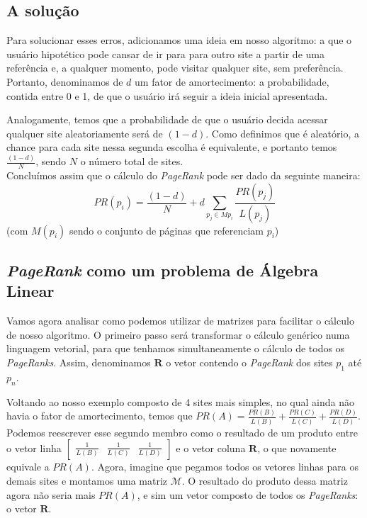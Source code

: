 \documentclass[11pt]{article}
\begin{document}
    \hypertarget{a-soluuxe7uxe3o}{%
\subsection{A solução}\label{a-soluuxe7uxe3o}}

Para solucionar esses erros, adicionamos uma ideia em nosso algoritmo: a
que o usuário hipotético pode cansar de ir para para outro site a partir
de uma referência e, a qualquer momento, pode visitar qualquer site, sem
preferência. Portanto, denominamos de \(d\) um fator de amortecimento: a
probabilidade, contida entre 0 e 1, de que o usuário irá seguir a ideia
inicial apresentada.

    Analogamente, temos que a probabilidade de que o usuário decida acessar
qualquer site aleatoriamente será de \((1 - d)\). Como definimos que é
aleatório, a chance para cada site nessa segunda escolha é equivalente,
e portanto temos \(\frac{(1 - d)}{N}\), sendo \(N\) o número total de
sites.\\
Concluímos assim que o cálculo do \emph{PageRank} pode ser dado da
seguinte maneira:
\[PR(p_i) = \displaystyle \frac{(1 - d)}{N} + d{\sum _{p_j\in M{p_i}}{\frac {PR(p_j)}{L(p_j)}}}\]
(com \(M(p_i)\) sendo o conjunto de páginas que referenciam \(p_i\))

    \hypertarget{pagerank-como-um-problema-de-uxe1lgebra-linear}{%
\subsection{\texorpdfstring{\emph{PageRank} como um problema de
Álgebra
Linear}{PageRank como um problema de Álgebra Linear}}\label{pagerank-como-um-problema-de-uxe1lgebra-linear}}

Vamos agora analisar como podemos utilizar de matrizes para facilitar o
cálculo de nosso algoritmo. O primeiro passo será transformar o cálculo
genérico numa linguagem vetorial, para que tenhamos simultaneamente o
cálculo de todos os \emph{PageRanks}. Assim, denominamos \(\mathbf {R}\)
o vetor contendo o \emph{PageRank} dos sites \(p_1\) até \(p_n\).

    Voltando ao nosso exemplo composto de 4 sites mais simples, no qual
ainda não havia o fator de amortecimento, temos que
\(PR(A) = \frac{PR(B)}{L(B)} + \frac{PR(C)}{L(C)} + \frac{PR(D)}{L(D)}\).
Podemos reescrever esse segundo membro como o resultado de um produto
entre o vetor linha
\(\begin{bmatrix}\frac{1}{L(B)} & \frac{1}{L(C)} & \frac{1}{L(D)}\end{bmatrix}\)
e o vetor coluna \(\mathbf {R}\), o que novamente equivale a \(PR(A)\).
Agora, imagine que pegamos todos os vetores linhas para os demais sites
e montamos uma matriz \(\mathcal {M}\). O resultado do produto dessa
matriz agora não seria mais \(PR(A)\), e sim um vetor composto de todos
os \emph{PageRanks}: o vetor \(\mathbf {R}\).
\end{document}
